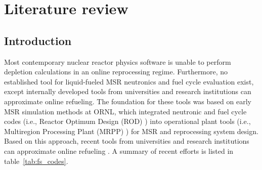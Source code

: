 \chapter[Literature review]{Literature review}

\section{Introduction}
Most contemporary nuclear reactor physics software is unable to perform depletion calculations in an online reprocessing regime. Furthermore, no established tool for liquid-fueled \gls{MSR} neutronics and fuel cycle evaluation exist, except internally developed tools from universities and research institutions can approximate online refueling. The foundation for these tools was based on early \gls{MSR} simulation methods at \gls{ORNL}, which integrated neutronic and fuel cycle codes (i.e., Reactor 
Optimum Design (ROD) \cite{bauman_rod_1971}) into operational plant tools (i.e., 
Multiregion Processing Plant (MRPP) \cite{kee_mrpp_1976}) for \gls{MSR} and 
reprocessing system design. Based on 
this approach, recent tools from universities and research institutions can
approximate online refueling \cite{serp_molten_2014-1}. A summary of recent
efforts is listed in table~\ref{tab:fs_codes}.
